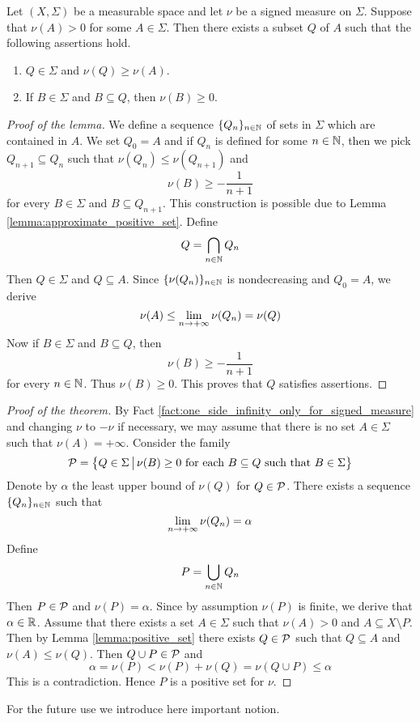 \begin{lemma}\label{lemma:positive_set}
    Let $\left(X,\Sigma\right)$ be a measurable space and let $\nu$ be a signed measure on $\Sigma$. Suppose that $\nu(A) > 0$ for some $A \in \Sigma$. Then there exists a subset $Q$ of $A$ such that the following assertions hold.
    \begin{enumerate}[label=\emph{\textbf{(\arabic*)}}, leftmargin=3.0em]
        \item $Q \in \Sigma$ and $\nu(Q) \geq \nu(A)$.
        \item If $B \in \Sigma$ and $B \subseteq Q$, then $\nu(B) \geq 0$.
    \end{enumerate}
\end{lemma}
\begin{proof}[Proof of the lemma]
    We define a sequence $\{Q_n\}_{n\in {\mathbb N}}$ of sets in $\Sigma$ which are contained in $A$. We set $Q_0 = A$ and if $Q_n$ is defined for some $n \in {\mathbb N}$, then we pick $Q_{n+1} \subseteq Q_n$ such that $\nu(Q_n) \leq \nu(Q_{n+1})$ and
    $$\nu\left(B\right) \geq - \frac{1}{n+1}$$
    for every $B \in \Sigma$ and $B\subseteq Q_{n+1}$. This construction is possible due to Lemma \ref{lemma:approximate_positive_set}. Define
    $$Q = \bigcap_{n\in {\mathbb N}}Q_n$$
    Then $Q \in \Sigma$ and $Q\subseteq A$. Since $\{\nu(Q_n)\}_{n\in {\mathbb N}}$ is nondecreasing and $Q_0 = A$, we derive
    $$\nu(A) \leq \lim_{n\rightarrow +\infty}\nu(Q_n) = \nu(Q) $$
    Now if $B \in \Sigma$ and $B \subseteq Q$, then
    $$\nu(B) \geq -\frac{1}{n + 1}$$
    for every $n \in {\mathbb N}$. Thus $\nu(B) \geq 0$. This proves that $Q$ satisfies assertions.
\end{proof}

\begin{proof}[Proof of the theorem]
    By Fact \ref{fact:one_side_infinity_only_for_signed_measure} and changing $\nu$ to $-\nu$ if necessary, we may assume that there is no set $A \in \Sigma$ such that $\nu(A) = +\infty$. Consider the family
    $${\mathcal P} = \big\{Q \in \Sigma\,\big|\,\nu(B)\geq 0\mbox{ for each }B\subseteq Q\mbox{ such that }B \in \Sigma\big\}$$
    Denote by $\alpha$ the least upper bound of $\nu(Q)$ for $Q \in {\mathcal P}$. There exists a sequence $\{Q_n\}_{n\in {\mathbb N}}$ such that
    $$\lim_{n\rightarrow +\infty}\nu(Q_n) = \alpha$$
    Define
    $$P = \bigcup_{n\in {\mathbb N}}Q_n$$
    Then $P \in {\mathcal P}$ and $\nu(P) = \alpha$. Since by assumption $\nu(P)$ is finite, we derive that $\alpha \in {\mathbb R}$. Assume that there exists a set $A \in \Sigma$ such that $\nu(A) > 0$ and $A \subseteq X\setminus P$. Then by Lemma \ref{lemma:positive_set} there exists $Q \in {\mathcal P}$ such that $Q \subseteq A$ and $\nu(A) \leq \nu(Q)$. Then $Q\cup P \in {\mathcal P}$ and
    $$\alpha = \nu(P) < \nu(P) + \nu(Q) = \nu(Q\cup P) \leq \alpha$$
    This is a contradiction. Hence $P$ is a positive set for $\nu$.
\end{proof}
\noindent
For the future use we introduce here important notion.

